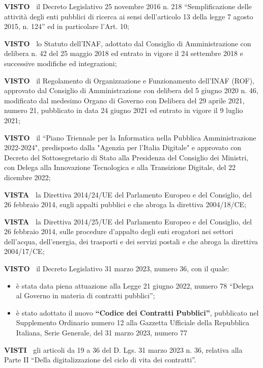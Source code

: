 \documentclass[a4paper,12pt]{letter}
\begin{document}
\textbf{VISTO~}	il Decreto Legislativo 25 novembre 2016 n. 218
``Semplificazione delle attività degli enti pubblici di ricerca ai
sensi dell’articolo 13 della legge 7 agosto 2015, n. 124'' ed in
particolare l’Art. 10;

\textbf{VISTO~}	lo Statuto dell’INAF, adottato dal Consiglio di
Amministrazione con delibera n. 42 del 25 maggio 2018 ed entrato in
vigore il 24 settembre 2018 e successive modifiche ed integrazioni;

\textbf{VISTO~}	 il Regolamento di Organizzazione e Funzionamento
dell’INAF (ROF), approvato dal Consiglio di Amministrazione con delibera
del 5 giugno 2020 n. 46, modificato dal medesimo Organo di Governo con
Delibera del 29 aprile 2021, numero 21, pubblicato in data 24 giugno
2021 ed entrato in vigore il 9 luglio 2021;

\textbf{VISTO~}	il ``Piano Triennale per la Informatica nella Pubblica
Amministrazione 2022-2024", predisposto dalla "Agenzia per l'Italia
Digitale" e approvato con Decreto del Sottosegretario di Stato alla
Presidenza del Consiglio dei Ministri, con Delega alla Innovazione
Tecnologica e alla Transizione Digitale, del 22 dicembre 2022;

\textbf{VISTA~}	la Direttiva 2014/24/UE del Parlamento Europeo e del
Consiglio, del 26 febbraio 2014, sugli appalti pubblici e che abroga la
direttiva 2004/18/CE;  

\textbf{VISTA~}	la Direttiva 2014/25/UE del Parlamento Europeo e del
Consiglio, del 26 febbraio 2014, sulle procedure d'appalto degli enti
erogatori nei settori dell'acqua, dell'energia, dei trasporti e dei
servizi postali e che abroga la direttiva 2004/17/CE; 

\textbf{VISTO~}	il Decreto Legislativo 31 marzo 2023, numero 36, con il
quale:
\begin{itemize}

\item  è stata data piena attuazione alla Legge 21 giugno 2022,
numero 78 ``Delega al Governo in materia di contratti pubblici'';

\item è stato adottato il nuovo \textbf{``Codice dei Contratti Pubblici''},
    pubblicato nel Supplemento Ordinario numero 12 alla Gazzetta Ufficiale
    della Repubblica Italiana, Serie Generale, del 31 marzo 2023, numero 77
\end{itemize}

\textbf{VISTI~}	gli articoli da 19 a 36 del D. Lgs. 31 marzo 2023 n. 36,
relativa alla Parte II ``Della digitalizzazione del ciclo di vita dei
contratti''.
\end{document}
